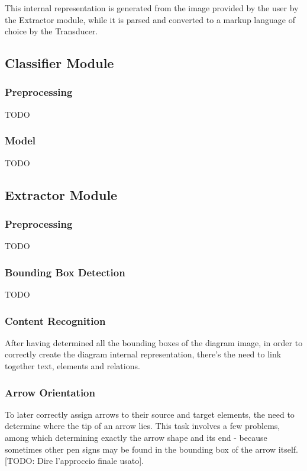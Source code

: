 \documentclass[conference]{IEEEtran}
\begin{document}
This internal representation is generated from the image provided by the user by the Extractor module, while it is parsed and converted to a markup language of choice by the Transducer. 

\subsection{Classifier Module}
\subsubsection{Preprocessing}
TODO \\

\subsubsection{Model}
TODO \\

\subsection{Extractor Module}
\subsubsection{Preprocessing}
TODO\\
\subsubsection{Bounding Box Detection}
TODO\\
\subsubsection{Content Recognition}
After having determined all the bounding boxes of the diagram image, in order to correctly create the diagram internal representation, there's the need to link together text, elements and relations.\\

\subsubsection{Arrow Orientation}
To later correctly assign arrows to their source and target elements, the need to determine where the tip of an arrow lies. This task involves a few problems, among which determining exactly the arrow shape and its end - because sometimes other pen signs may be found in the bounding box of the arrow itself. [TODO: Dire l'approccio finale usato]. \\
\end{document}
